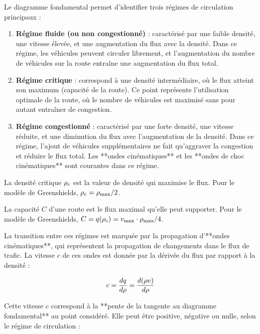 Le diagramme fondamental permet d'identifier trois régimes de circulation principaux :

\begin{enumerate}
    \item \textbf{Régime fluide (ou non congestionné)} : caractérisé par une faible densité, une vitesse élevée, et une augmentation du flux avec la densité. Dans ce régime, les véhicules peuvent circuler librement, et l'augmentation du nombre de véhicules sur la route entraîne une augmentation du flux total.
    \item \textbf{Régime critique} : correspond à une densité intermédiaire, où le flux atteint son maximum (capacité de la route). Ce point représente l'utilisation optimale de la route, où le nombre de véhicules est maximisé sans pour autant entraîner de congestion.
    \item \textbf{Régime congestionné} : caractérisé par une forte densité, une vitesse réduite, et une diminution du flux avec l'augmentation de la densité. Dans ce régime, l'ajout de véhicules supplémentaires ne fait qu'aggraver la congestion et réduire le flux total. Les **ondes cinématiques** et les **ondes de choc cinématiques** sont courantes dans ce régime.
\end{enumerate}

\begin{definition}
La densité critique $\rho_c$ est la valeur de densité qui maximise le flux. Pour le modèle de Greenshields, $\rho_c = \rho_{\text{max}}/2$.
\end{definition}

\begin{definition}
La capacité $C$ d'une route est le flux maximal qu'elle peut supporter. Pour le modèle de Greenshields, $C = q(\rho_c) = v_{\text{max}} \cdot \rho_{\text{max}}/4$.
\end{definition}

La transition entre ces régimes est marquée par la propagation d'**ondes cinématiques**, qui représentent la propagation de changements dans le flux de trafic. La vitesse $c$ de ces ondes est donnée par la dérivée du flux par rapport à la densité :

\begin{align}
c = \frac{dq}{d\rho} = \frac{d(\rho v)}{d\rho}
\label{eq:wave_speed}
\end{align}

Cette vitesse $c$ correspond à la **pente de la tangente au diagramme fondamental** au point considéré. Elle peut être positive, négative ou nulle, selon le régime de circulation :

